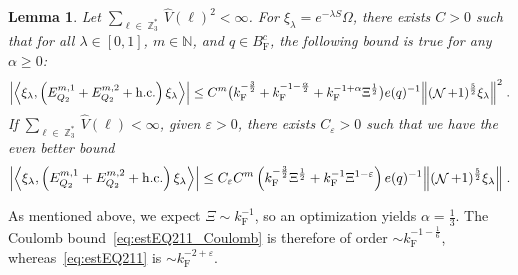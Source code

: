 \documentclass[12pt,a4paper]{article}
\numberwithin{equation}{section}
\newcommand{\NNN}{\mathbb{N}}
\newcommand{\1}{\mathbb{I}}
\newcommand{\F}{\mathrm{F}}
\DeclareMathOperator{\Z}{\mathbb{Z}}
\DeclareMathOperator{\NN}{\mathcal{N}}
\newcommand{\half}{\frac{1}{2}}
\newcommand{\eva}[1]{\left\langle #1 \right\rangle}
\theoremstyle{plain}
\newtheorem{lemma}[theorem]{Lemma}
\theoremstyle{definition}
\theoremstyle{remark}
\theoremstyle{plain}
\theoremstyle{definition}
\theoremstyle{remark}
\begin{document}
\begin{lemma} \label{lem:EQ211}
Let $ \sum_{\ell \in \Z_3^*} \hat{V}(\ell)^2 < \infty $. For $\xi_\lambda = e^{-\lambda S} \Omega$, there exists $ C > 0 $ such that for all $ \lambda \in [0,1] $, $ m \in \NNN $, and $ q \in B_{\F}^c $, the following bound is true for any $ \alpha \ge 0 $:
\begin{align}
	\abs{\eva{\xi_\lambda,\left(E^{m,1}_{Q_2}+E^{m,2}_{Q_2}+\mathrm{h.c.}\right) \xi_\lambda }}
	\leq C^m \big( k_{\F}^{-\frac 32}
		+ k_{\F}^{-1-\frac{\alpha}{2}} 
		+ k_{\F}^{-1+\alpha} \Xi^{\half} \big) e(q)^{-1}
		\norm { (\NN+1)^{\frac 52} \xi_\lambda }^2 \;. \label{eq:estEQ211_Coulomb}
\end{align}
If $ \sum_{\ell \in \Z_3^*} \hat{V}(\ell) < \infty $, given $ \varepsilon > 0 $, there exists $ C_\varepsilon > 0 $ such that we have the even better bound
\begin{align}
	\abs{\eva{\xi_\lambda,\left(E^{m,1}_{Q_2}+E^{m,2}_{Q_2}+\mathrm{h.c.}\right) \xi_\lambda }}
	\leq C_\varepsilon C^m \left( k_{\F}^{-\frac{3}{2}} \Xi^\half 
		+ k_{\F}^{-1}\Xi^{1-\varepsilon} \right) e(q)^{-1} 
		\norm { (\NN+1)^{\frac 52} \xi_\lambda } \;. \label{eq:estEQ211}
\end{align}
\end{lemma}

\textcolor{green!30!black}{As mentioned above, we expect $ \Xi \sim k_{\F}^{-1} $, so an optimization yields $ \alpha = \frac 13 $. The Coulomb bound~\eqref{eq:estEQ211_Coulomb} is therefore of order $ \sim k_{\F}^{-1-\frac 16} $, whereas~\eqref{eq:estEQ211} is $ \sim k_{\F}^{-2 + \varepsilon} $.}
\end{document}
